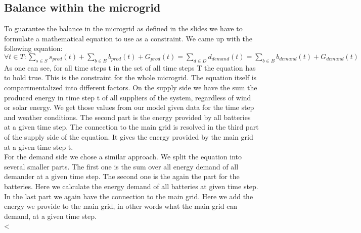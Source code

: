 \subsection{Balance within the microgrid}
To guarantee the balance in the microgrid as defined in the slides we have to formulate a mathematical equation to use as a constraint.
We came up with the following equation:\\
$\forall t \in T: \sum_{s \in S}{s_{prod}(t)} + \sum_{b \in B}{b_{prod}(t)} + G_{prod}(t) = \sum_{d \in D}{d_{demand}(t)} = \sum_{b \in B}{b_{demand}(t)} + G_{demand}(t)$\\
As one can see, for all time steps t in the set of all time steps T the equation has to hold true.
This is the constraint for the whole microgrid.
The equation itself is compartmentalized into different factors.
On the supply side we have the sum the produced energy in time step t of all suppliers of the system, regardless of wind or solar energy.
We get those values from our model given data for the time step and weather conditions.
The second part is the energy provided by all batteries at a given time step.
The connection to the main grid is resolved in the third part of the supply side of the equation.
It gives the energy provided by the main grid at a given time step t.\\
For the demand side we chose a similar  approach.
We split the equation into several smaller parts.
The first one is the sum over all energy demand of all  demander at a given time step.
The second one is the again the part for the batteries.
Here we calculate the energy demand of all batteries at given time step.
In the last part we again have the connection to the main grid.
Here we add the energy we provide to the main grid, in other words what the main grid can demand, at a given time step.\\<